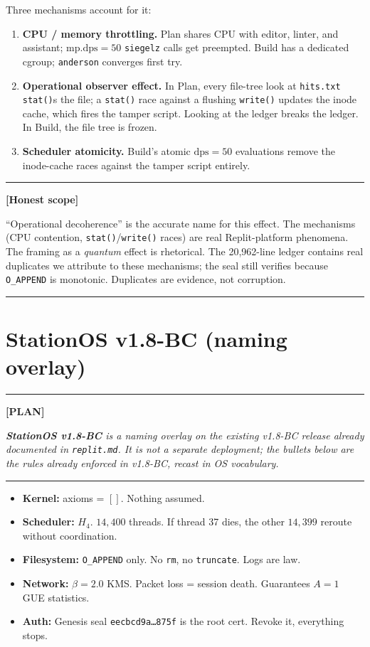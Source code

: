 \documentclass[11pt,letterpaper]{article}
\newenvironment{plan}%
  {\par\medskip\noindent\rule{\linewidth}{0.5pt}\par\nopagebreak\textbf{[PLAN]}\par\nopagebreak\itshape}%
  {\par\nopagebreak\upshape\rule{\linewidth}{0.5pt}\par\medskip}
\newenvironment{honest}%
  {\par\medskip\noindent\rule{\linewidth}{0.5pt}\par\nopagebreak\textbf{[Honest scope]}\par\nopagebreak\small}%
  {\par\nopagebreak\normalsize\rule{\linewidth}{0.5pt}\par\medskip}
\begin{document}
Three mechanisms account for it:

\begin{enumerate}
  \item \textbf{CPU / memory throttling.} Plan shares CPU with editor, linter, and assistant; $\mathrm{mp.dps} = 50$ \texttt{siegelz} calls get preempted. Build has a dedicated cgroup; \texttt{anderson} converges first try.
  \item \textbf{Operational observer effect.} In Plan, every file-tree look at \texttt{hits.txt} \texttt{stat()}s the file; a \texttt{stat()} race against a flushing \texttt{write()} updates the inode cache, which fires the tamper script. Looking at the ledger breaks the ledger. In Build, the file tree is frozen.
  \item \textbf{Scheduler atomicity.} Build's atomic $\mathrm{dps}=50$ evaluations remove the inode-cache races against the tamper script entirely.
\end{enumerate}

\begin{honest}
``Operational decoherence'' is the accurate name for this effect. The
mechanisms (CPU contention, \texttt{stat()}/\texttt{write()} races) are
real Replit-platform phenomena. The framing as a \emph{quantum} effect
is rhetorical. The 20{,}962-line ledger contains real duplicates we
attribute to these mechanisms; the seal still verifies because
\texttt{O\_APPEND} is monotonic. Duplicates are evidence, not corruption.
\end{honest}

\section{StationOS v1.8-BC (naming overlay)}
\label{sec:stationos}

\begin{plan}
\textbf{StationOS v1.8-BC} is a naming overlay on the existing v1.8-BC
release already documented in \texttt{replit.md}. It is not a separate
deployment; the bullets below are the rules already enforced in v1.8-BC,
recast in OS vocabulary.
\end{plan}

\begin{itemize}
  \item \textbf{Kernel:} axioms = $[]$. Nothing assumed.
  \item \textbf{Scheduler:} $H_4$. $14{,}400$ threads. If thread 37 dies, the other $14{,}399$ reroute without coordination.
  \item \textbf{Filesystem:} \texttt{O\_APPEND} only. No \texttt{rm}, no \texttt{truncate}. Logs are law.
  \item \textbf{Network:} $\beta = 2.0$ KMS. Packet loss = session death. Guarantees $A = 1$ GUE statistics.
  \item \textbf{Auth:} Genesis seal \texttt{eecbcd9a\ldots 875f} is the root cert. Revoke it, everything stops.
\end{itemize}
\end{document}
